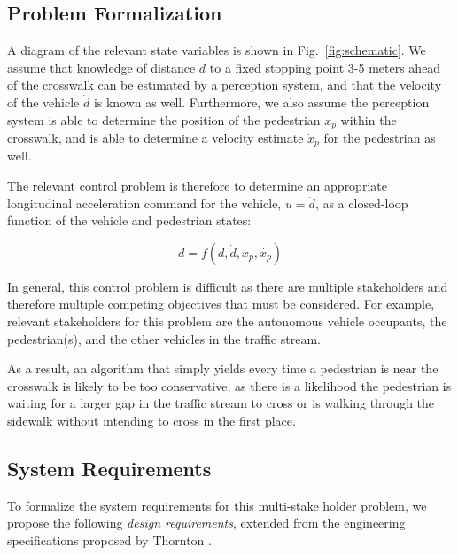 \documentclass[letterpaper, 10 pt, conference]{ieeeconf}  %
\begin{document}
\subsection{Problem Formalization}
\label{sec:probform}

A diagram of the relevant state variables is shown in Fig.~\ref{fig:schematic}. We assume that knowledge of distance $d$ to a fixed stopping point 3-5 meters ahead of the crosswalk can be estimated by a perception system, and that the velocity of the vehicle $\dot{d}$ is known as well. Furthermore, we also assume the perception system is able to determine the position of the pedestrian $x_p$ within the crosswalk, and is able to determine a velocity estimate $\dot{x}_p$ for the pedestrian as well. 


The relevant control problem is therefore to determine an appropriate longitudinal acceleration command for the vehicle, $u = \ddot{d}$, as a closed-loop function of the vehicle and pedestrian states:

\begin{equation}
\ddot{d} = f(d, \dot{d}, x_p, \dot{x_p})
\end{equation}

In general, this control problem is difficult as there are multiple stakeholders and therefore multiple competing objectives that must be considered. For example, relevant stakeholders for this problem are the autonomous vehicle occupants, the pedestrian(s), and the other vehicles in the traffic stream. 

As a result, an algorithm that simply yields every time a pedestrian is near the crosswalk is likely to be too conservative, as there is a likelihood the pedestrian is waiting for a larger gap in the traffic stream to cross or is walking through the sidewalk without intending to cross in the first place. 

\subsection{System Requirements}

To formalize the system requirements for this multi-stake holder problem, we propose the following \textit{design requirements}, extended from the engineering specifications proposed by Thornton \cite{Thornton2018}. 
\end{document}
